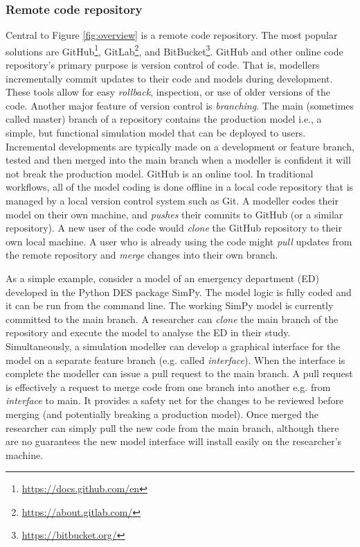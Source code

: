 \documentclass[]{interact}
\theoremstyle{plain}%
\theoremstyle{definition}
\theoremstyle{remark}
\begin{document}
\subsubsection{Remote code repository}
Central to Figure \ref{fig:overview} is a remote code repository. The most popular solutions are GitHub\footnote{\url{https://docs.github.com/en}}, GitLab\footnote{\url{https://about.gitlab.com/}}, and BitBucket\footnote{\url{https://bitbucket.org/}}. GitHub and other online code repository’s primary purpose is version control of code.  That is, modellers incrementally commit updates to their code and models during development. These tools allow for easy \textit{rollback}, inspection, or use of older versions of the code. Another major feature of version control is \textit{branching}. The main (sometimes called master) branch of a repository contains the production model i.e., a simple, but functional simulation model that can be deployed to users.  Incremental developments are typically made on a development or feature branch, tested and then merged into the main branch when a modeller is confident it will not break the production model. GitHub is an online tool.  In traditional workflows, all of the model coding is done offline in a local code repository that is managed by a local version control system such as Git. A modeller codes their model on their own machine, and \textit{pushes} their commits to GitHub (or a similar repository). A new user of the code would \textit{clone} the GitHub repository to their own local machine. A user who is already using the code might \textit{pull} updates from the remote repository and \textit{merge} changes into their own branch.

As a simple example, consider a model of an emergency department (ED) developed in the Python DES package SimPy. The model logic is fully coded and it can be run from the command line. The working SimPy model is currently committed to the main branch. A researcher can \textit{clone} the main branch of the repository and execute the model to analyse the ED in their study. Simultaneously, a simulation modeller can develop a graphical interface for the model on a separate feature branch (e.g. called \textit{interface}). When the interface is complete the modeller can issue a pull request to the main branch.  A pull request is effectively a request to merge code from one branch into another e.g. from \textit{interface} to main.  It provides a safety net for the changes to be reviewed before merging (and potentially breaking a production model). Once merged the researcher can simply pull the new code from the main branch, although there are no guarantees the new model interface will install easily on the researcher's machine.
\end{document}
